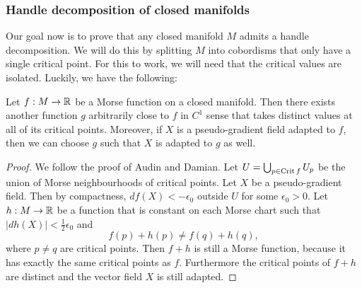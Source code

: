 \begin{figure}[H]
    \centering
\end{figure}

\subsubsection*{Handle decomposition of closed manifolds}

Our goal now is to prove that any closed manifold $M$ admits a handle decomposition.
We will do this by splitting $M$ into cobordisms that only have a single critical point.
For this to work, we will need that the critical values are isolated.
Luckily, we have the following:

\begin{prop}
    Let $f: M \to  \mathbb{R}$ be a Morse function on a closed manifold.
    Then there exists another function $g$ arbitrarily close to $f$ in $C^{1}$ sense that takes distinct values at all of its critical points.
    Moreover, if $X$ is a pseudo-gradient field adapted to  $f$,
    then we can choose $g$ such that $X$ is adapted to $g$ as well.
\end{prop}
\begin{proof}
    We follow the proof of Audin and Damian.
    Let $U = \bigcup_{p \in \operatorname{Crit} f} U_p$ be the union of Morse neighbourhoods of critical points.
    Let $X$ be a pseudo-gradient field.
    Then by compactness, $df(X) < - \epsilon_0$ outside $U$ for some $\epsilon_0>0$.
    Let $h: M \to  \mathbb{R}$ be a function that is constant on each Morse chart such that $|dh(X)| < \frac{1}{2}\epsilon_0$ and
    \[
        f(p) + h(p) \neq f(q) + h(q), 
    \] 
    where $p \neq q$ are critical points.
    Then $f+h$ is still a Morse function, because it has exactly the same critical points as $f$.
    Furthermore the critical points of $f + h$ are distinct and the vector field $X$ is still adapted.
\end{proof}

